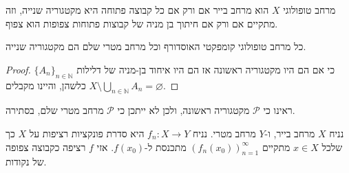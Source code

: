 \documentclass{tstextbook}
\begin{document}
\begin{proposition}
מרחב טופולוגי \(X\) הוא מרחב בייר אם ורק אם כל קבוצה פתוחה היא מקטגוריה שנייה, וזה מתקיים אם ורק אם חיתוך בן מניה של קבוצות פתוחות צפופות הוא צפוף.

\end{proposition}
\begin{corollary}
כל מרחב טופולוגי קומפקטי האוסדורף וכל מרחב מטרי שלם הם מקטגוריה שנייה.

\end{corollary}
\begin{proof}
כי אם הם היו מקטגוריה ראשונה אז הם היו איחוד בן-מניה של דלילות \(\{A_{n}\}_{n\in\mathbb{N}}\) כלשהן, והיינו מקבלים \(X\setminus\bigcup_{n\in\mathbb{N}}A_{n}=\varnothing\).

\end{proof}
\begin{example}
ראינו כי \(\mathcal{P}\) מקטגוריה ראשונה, ולכן לא ייתכן כי \(\mathcal{P}\) מרחב מטרי שלם, בסתירה.

\end{example}
\begin{example}
נניח \(X\) מרחב בייר, ו-\(Y\) מרחב מטרי. נניח \(f_{n}:X\to Y\) היא סדרת פונקציות רציפות על \(X\) כך שלכל \(x \in X\) מתקיים \((f_{n}(x_{0}))_{n=1}^{\infty}\) מתכנסת ל-\(f(x_{0})\). אזי \(f\) רציפה כקבוצה צפופה של נקודות.

\end{example}
\end{document}
